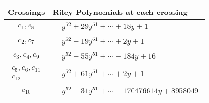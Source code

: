\documentclass[1p]{elsarticle_modified}
\theoremstyle{definition}
\begin{document}
\begin{tabular}{m{50pt}|m{274pt}}
Crossings & \hspace{64pt}Riley Polynomials at each crossing \\
\hline $$\begin{aligned}c_{1},c_{8}\end{aligned}$$&$\begin{aligned}
&y^{52}+29 y^{51}+\cdots+18 y+1
\end{aligned}$\\
\hline $$\begin{aligned}c_{2},c_{7}\end{aligned}$$&$\begin{aligned}
&y^{52}-19 y^{51}+\cdots+2 y+1
\end{aligned}$\\
\hline $$\begin{aligned}c_{3},c_{4},c_{9}\end{aligned}$$&$\begin{aligned}
&y^{52}-55 y^{51}+\cdots-184 y+16
\end{aligned}$\\
\hline $$\begin{aligned}c_{5},c_{6},c_{11}\\c_{12}\end{aligned}$$&$\begin{aligned}
&y^{52}+61 y^{51}+\cdots+2 y+1
\end{aligned}$\\
\hline $$\begin{aligned}c_{10}\end{aligned}$$&$\begin{aligned}
&y^{52}-31 y^{51}+\cdots-170476614 y+8958049
\end{aligned}$\\
\hline
\end{tabular}
\vskip 2pc
\end{document}
